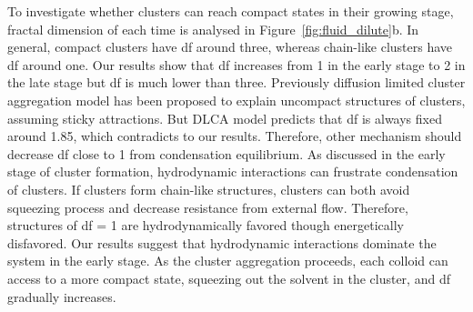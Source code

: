 To investigate whether clusters can reach compact states in their growing stage, fractal dimension of each time is analysed in Figure~\ref{fig:fluid_dilute}b.
In general, compact clusters have df around three, whereas chain-like clusters have df around one.
Our results show that df increases from 1 in the early stage to 2 in the late stage but df is much lower than three.
Previously diffusion limited cluster aggregation model has been proposed to explain uncompact structures of clusters, assuming sticky attractions.
But DLCA model predicts that df is always fixed around 1.85, which contradicts to our results.
Therefore, other mechanism should decrease df close to 1 from condensation equilibrium.
As discussed in the early stage of cluster formation, hydrodynamic interactions can frustrate condensation of clusters.
If clusters form chain-like structures, clusters can both avoid squeezing process and decrease resistance from external flow.
Therefore, structures of df = 1 are hydrodynamically favored though energetically disfavored.
Our results suggest that hydrodynamic interactions dominate the system in the early stage.
As the cluster aggregation proceeds, each colloid can access to a more compact state, squeezing out the solvent in the cluster, and df gradually increases.




